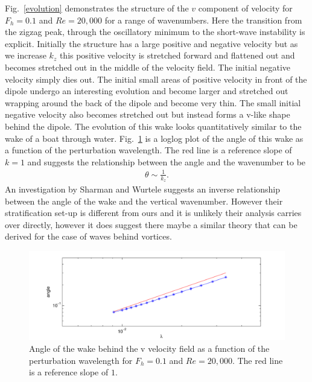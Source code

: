Fig.~\ref{evolution} demonstrates the structure of the $v$ component of velocity for $F_{h}=0.1$ and $Re=20{,}000$ for a range of wavenumbers. Here the transition from the zigzag peak, through the oscillatory minimum to the short-wave instability is explicit. Initially the structure has a large positive and negative velocity but as we increase $k_{z}$ this positive velocity is stretched forward and flattened out and becomes stretched out in the middle of the velocity field. The initial negative velocity simply dies out. The initial small areas of positive velocity in front of the dipole undergo an interesting evolution and become larger and stretched out wrapping around the back of the dipole and become very thin. The small initial negative velocity also becomes stretched out but instead forms a v-like shape behind the dipole. The evolution of this wake looks quantitatively similar to the wake of a boat through water. Fig.~\ref{wake} is a loglog plot of the angle of this wake as a function of the perturbation wavelength. The red line is a reference slope of $k=1$ and suggests the relationship between the angle and the wavenumber to be
\begin{align}
\theta \sim \frac{1}{k_{z}}.
\end{align} 
An investigation by Sharman and Wurtele \cite{sharman1983ship} suggests an inverse relationship between the angle of the wake and the vertical wavenumber. However their stratification set-up is different from ours and it is unlikely their analysis carries over directly, however it does suggest there maybe a similar theory that can be derived for the case of waves behind vortices. 

\begin{figure}
\begin{center}
\includegraphics[width=\textwidth]{wake_fh_01_re_20000}
\caption{Angle of the wake behind the v velocity field as a function of the perturbation wavelength for $F_{h}=0.1$ and $Re=20{,}000$. The red line is a reference slope of $1$.}
\label{wake}
\end{center}
\end{figure}

